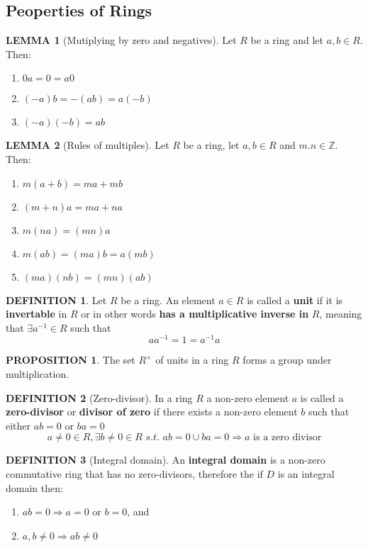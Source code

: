\documentclass[10pt]{article}
\theoremstyle{definition}
\newtheorem{definition}{DEFINITION}[subsection]
\newcommand{\suchthat}{\textit{ s.t. }}
\newtheorem{lemma}{LEMMA}[subsection]
\newtheorem{prop}{PROPOSITION}[subsection]
\begin{document}
\subsection{Peoperties of Rings}
\begin{lemma}[Mutiplying by zero and negatives]
    Let $R$ be a ring and let $a,b \in R$. Then:
    \begin{enumerate}
        \item $0a = 0 = a0$
        \item $(-a)b = -(ab) = a(-b)$
        \item $(-a)(-b) = ab$
    \end{enumerate}
\end{lemma}

\begin{lemma}[Rules of multiples]
    Let $R$ be a ring, let $a,b\in R$ and $m.n \in \mathbb{Z}$. Then:
    \begin{enumerate}
        \item $m(a+b) = ma + mb$
        \item $(m+n)a = ma + na$
        \item $m(na) = (mn)a$
        \item $m(ab) = (ma)b = a(mb)$
        \item $(ma)(nb) = (mn)(ab)$
    \end{enumerate}
\end{lemma}

\begin{definition}
    Let $R$ be a ring. An element $a \in R$ is called a \textbf{unit} if it is \textbf{invertable} in $R$ or in other words \textbf{has a multiplicative inverse in} $R$, meaning that $\exists a^{-1} \in R$ such that $$aa^{-1} = 1 = a^{-1}a$$
\end{definition}

\begin{prop}
    The set $R^{\times}$ of units in a ring $R$ forms a group under multiplication.
\end{prop}

\begin{definition}[Zero-divisor]
    In a ring $R$ a non-zero element $a$ is called a \textbf{zero-divisor} or \textbf{divisor of zero} if there exists a non-zero element $b$ such that either $ab = 0$ or $ba = 0$
    $${a \neq 0 \in R, \exists b \neq 0 \in R \suchthat ab = 0 \cup ba = 0} \Rightarrow {a\text{ is a zero divisor}}$$
\end{definition}

\begin{definition}[Integral domain]
    An \textbf{integral domain} is a non-zero commutative ring that has no zero-divisors, therefore the if $D$ is an integral domain then:
    \begin{enumerate}
        \item $ab = 0 \Rightarrow  a = 0$ or $b = 0$, and
        \item $a,b\neq 0 \Rightarrow ab \neq 0$
    \end{enumerate}
\end{definition}
\end{document}
